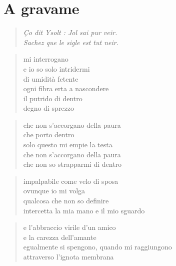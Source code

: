 \chapter*{A gravame}

\begin{verse}
    \begin{otherlanguage}{french}
        \emph{Ço dit Ysolt : Jol sai pur veir.\\
        Sachez que le sigle est tut neir.}
    \end{otherlanguage}
\end{verse}


\begin{verse}
    mi interrogano\\
    e io so solo intridermi\\
    di umidità fetente\\
    ogni fibra erta a nascondere\\
    il putrido di dentro\\
    degno di sprezzo
\end{verse}

\begin{verse}
    che non s'accorgano della paura\\
    che porto dentro\\
    solo questo mi empie la testa\\
    che non s'accorgano della paura\\
    che non so strapparmi di dentro
\end{verse}

\clearpage


\begin{verse}
    impalpabile come velo di sposa\\
    ovunque io mi volga\\
    qualcosa che non so definire\\
    intercetta la mia mano e il mio sguardo
\end{verse}

\begin{verse}
    e l'abbraccio virile d'un amico\\
    e la carezza dell'amante\\
    egualmente si spengono, quando mi raggiungono\\
    attraverso l'ignota membrana
\end{verse}

